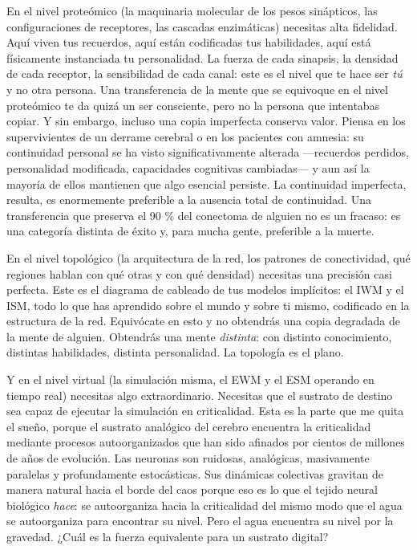 \documentclass[11pt, twoside, openright]{book}
\begin{document}
En el nivel proteómico (la maquinaria molecular de los pesos sinápticos, las configuraciones de receptores, las cascadas enzimáticas) necesitas alta fidelidad. Aquí viven tus recuerdos, aquí están codificadas tus habilidades, aquí está físicamente instanciada tu personalidad. La fuerza de cada sinapsis, la densidad de cada receptor, la sensibilidad de cada canal: este es el nivel que te hace ser \textit{tú} y no otra persona. Una transferencia de la mente que se equivoque en el nivel proteómico te da quizá un ser consciente, pero no la persona que intentabas copiar. Y sin embargo, incluso una copia imperfecta conserva valor. Piensa en los supervivientes de un derrame cerebral o en los pacientes con amnesia: su continuidad personal se ha visto significativamente alterada ---recuerdos perdidos, personalidad modificada, capacidades cognitivas cambiadas--- y aun así la mayoría de ellos mantienen que algo esencial persiste. La continuidad imperfecta, resulta, es enormemente preferible a la ausencia total de continuidad. Una transferencia que preserva el 90 \% del conectoma de alguien no es un fracaso: es una categoría distinta de éxito y, para mucha gente, preferible a la muerte.

En el nivel topológico (la arquitectura de la red, los patrones de conectividad, qué regiones hablan con qué otras y con qué densidad) necesitas una precisión casi perfecta. Este es el diagrama de cableado de tus modelos implícitos: el IWM y el ISM, todo lo que has aprendido sobre el mundo y sobre ti mismo, codificado en la estructura de la red. Equivócate en esto y no obtendrás una copia degradada de la mente de alguien. Obtendrás una mente \textit{distinta}: con distinto conocimiento, distintas habilidades, distinta personalidad. La topología es el plano.

Y en el nivel virtual (la simulación misma, el EWM y el ESM operando en tiempo real) necesitas algo extraordinario. Necesitas que el sustrato de destino sea capaz de ejecutar la simulación en criticalidad. Esta es la parte que me quita el sueño, porque el sustrato analógico del cerebro encuentra la criticalidad mediante procesos autoorganizados que han sido afinados por cientos de millones de años de evolución. Las neuronas son ruidosas, analógicas, masivamente paralelas y profundamente estocásticas. Sus dinámicas colectivas gravitan de manera natural hacia el borde del caos porque eso es lo que el tejido neural biológico \textit{hace}: se autoorganiza hacia la criticalidad del mismo modo que el agua se autoorganiza para encontrar su nivel. Pero el agua encuentra su nivel por la gravedad. ¿Cuál es la fuerza equivalente para un sustrato digital?
\end{document}
